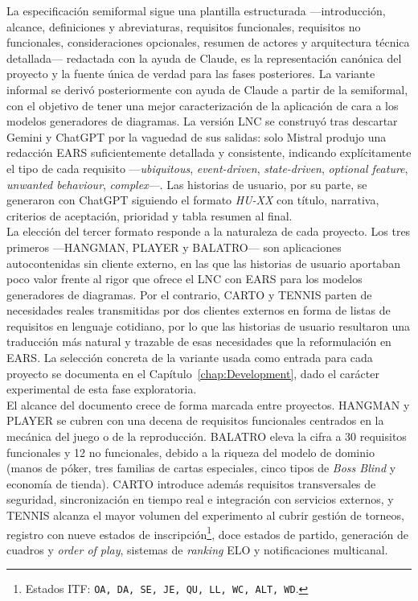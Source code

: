 La especificación semiformal sigue una plantilla estructurada ---introducción, alcance, definiciones y abreviaturas, requisitos funcionales, requisitos no funcionales, consideraciones opcionales, resumen de actores y arquitectura técnica detallada--- redactada con la ayuda de Claude, es la representación canónica del proyecto y la fuente única de verdad para las fases posteriores. La variante informal se derivó posteriormente con ayuda de Claude a partir de la semiformal, con el objetivo de tener una mejor caracterización de la aplicación de cara a los modelos generadores de diagramas. La versión \ac{LNC} se construyó tras descartar Gemini y ChatGPT por la vaguedad de sus salidas: solo Mistral produjo una redacción \ac{EARS} suficientemente detallada y consistente, indicando explícitamente el tipo de cada requisito ---\textit{ubiquitous}, \textit{event-driven}, \textit{state-driven}, \textit{optional feature}, \textit{unwanted behaviour}, \textit{complex}---. Las historias de usuario, por su parte, se generaron con ChatGPT siguiendo el formato \textit{HU-XX} con título, narrativa, criterios de aceptación, prioridad y tabla resumen al final.\\

La elección del tercer formato responde a la naturaleza de cada proyecto. Los tres primeros ---\ac{HANGMAN}, \ac{PLAYER} y \ac{BALATRO}--- son aplicaciones autocontenidas sin cliente externo, en las que las historias de usuario aportaban poco valor frente al rigor que ofrece el \ac{LNC} con \ac{EARS} para los modelos generadores de diagramas. Por el contrario, \ac{CARTO} y \ac{TENNIS} parten de necesidades reales transmitidas por dos clientes externos en forma de listas de requisitos en lenguaje cotidiano, por lo que las historias de usuario resultaron una traducción más natural y trazable de esas necesidades que la reformulación en \ac{EARS}. La selección concreta de la variante usada como entrada para cada proyecto se documenta en el Capítulo~\ref{chap:Development}, dado el carácter experimental de esta fase exploratoria.\\

El alcance del documento crece de forma marcada entre proyectos. \ac{HANGMAN} y \ac{PLAYER} se cubren con una decena de requisitos funcionales centrados en la mecánica del juego o de la reproducción. \ac{BALATRO} eleva la cifra a 30 requisitos funcionales y 12 no funcionales, debido a la riqueza del modelo de dominio (manos de póker, tres familias de cartas especiales, cinco tipos de \textit{Boss Blind} y economía de tienda). \ac{CARTO} introduce además requisitos transversales de seguridad, sincronización en tiempo real e integración con servicios externos, y \ac{TENNIS} alcanza el mayor volumen del experimento al cubrir gestión de torneos, registro con nueve estados de inscripción\footnote{Estados ITF: \texttt{OA, DA, SE, JE, QU, LL, WC, ALT, WD}.}, doce estados de partido, generación de cuadros y \textit{order of play}, sistemas de \textit{ranking} ELO y notificaciones multicanal.\\


